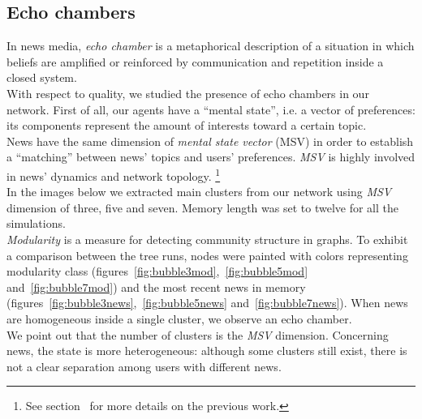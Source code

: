 \subsection{Echo chambers}
In news media, \textit{echo chamber} is a metaphorical description
of a situation in which beliefs are amplified or reinforced by
communication and repetition inside a closed
system.\cite{echochamwiki,echocham}\\
With respect to quality, we studied the presence of echo chambers
in our network.
First of all, our agents have a ``mental  state'', i.e. a vector of
preferences: its components represent the amount of interests toward
a certain topic.\\
News have the same dimension of \textit{mental state vector} (MSV)
in order to establish a ``matching'' between news' topics and users'
preferences.
\textit{MSV} is highly involved in news' dynamics and network
topology.
\footnote{See section~ for more
  details on the previous work.}\\
In the images below we extracted main clusters from our network using
\textit{MSV} dimension of three, five and seven.
Memory length was set to twelve for all the simulations.\\
\textit{Modularity} is a measure for detecting community
structure in graphs.\cite{modulwiki}
To exhibit a comparison between the tree runs,
nodes were painted with colors representing modularity class
(figures~\ref{fig:bubble3mod},~\ref{fig:bubble5mod} and~\ref{fig:bubble7mod})
and the most recent news in memory
(figures~\ref{fig:bubble3news},~\ref{fig:bubble5news} and~\ref{fig:bubble7news}).
When news are homogeneous inside a single cluster, we observe
an echo chamber.\\
We point out that the number of clusters is the \textit{MSV} dimension.
Concerning news, the state is more heterogeneous:
although some clusters still exist, there is not a clear separation
among users with different news.
%
